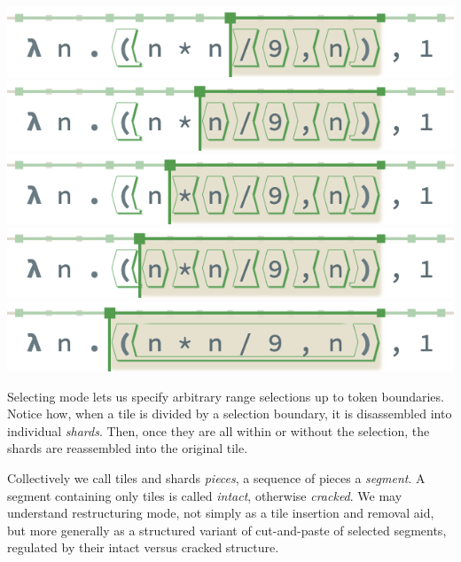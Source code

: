 \begin{minipage}[t]{0.495\columnwidth}
  \includegraphics[width=\textwidth]{img/selection-5.png}
  \includegraphics[width=\textwidth]{img/selection-6.png}
  \includegraphics[width=\textwidth]{img/selection-7.png}
  \includegraphics[width=\textwidth]{img/selection-8.png}
  \includegraphics[width=\textwidth]{img/selection-9.png}
\end{minipage}

\noindent
Selecting mode lets us specify arbitrary range selections up
to token boundaries.
Notice how, when a tile is divided by a selection boundary,
it is disassembled into individual \emph{shards}.
Then, once they are all within or without the selection,
the shards are reassembled into the original tile.

Collectively we call tiles and shards \emph{pieces},
a sequence of pieces a \emph{segment}.
A segment containing only tiles is called \emph{intact},
otherwise \emph{cracked}.
We may understand restructuring mode, not simply as a tile insertion
and removal aid, but more generally as a structured variant of
cut-and-paste of selected segments, regulated by their intact versus
cracked structure.


